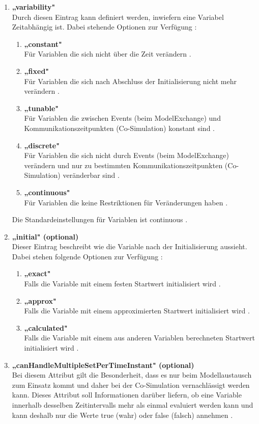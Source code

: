 \begin{enumerate}
	\item \textbf{„variability"} \cite[S.48]{25} \\
	Durch diesen Eintrag kann definiert werden, inwiefern eine Variabel Zeitabhängig ist. Dabei
	stehende Optionen zur Verfügung \cite[S.48]{25}:
	\begin{enumerate}
		\item \textbf{„constant"} \cite[S.48]{25} \\
		Für Variablen die sich nicht über die Zeit verändern \cite[S.48]{25}.
		\item \textbf{„fixed"} \cite[S.48]{25} \\
		Für Variablen die sich nach Abschluss der Initialisierung nicht mehr verändern
		\cite[S.48]{25}.
		\item \textbf{„tunable"} \cite[S.48]{25} \\
		Für Variablen die zwischen Events (beim ModelExchange) und
		Kommunikationszeitpunkten (Co-Simulation) konstant sind \cite[S.48]{25}.
		\newpage
		\item \textbf{„discrete"} \cite[S.48]{25} \\
		Für Variablen die sich nicht durch Events (beim ModelExchange)
		verändern und nur zu bestimmten Kommunikationszeitpunkten (Co-Simulation) veränderbar
		sind \cite[S.48]{25}.
		\item \textbf{„continuous"} \cite[S.48]{25} \\
		Für Variablen die keine Restriktionen für Veränderungen haben \cite[S.48]{25}.
	\end{enumerate}
	Die Standardeinstellungen für Variablen ist continuous \cite[S.48]{25}.
	\item \textbf{„initial" (optional)} \cite[S.48f]{25} \\
	Dieser Eintrag beschreibt wie die Variable nach der Initialisierung aussieht. Dabei stehen
	folgende Optionen zur Verfügung \cite[S.48f]{25}:
	\begin{enumerate}
		\item \textbf{„exact"} \cite[S.48f]{25} \\
		Falls die Variable mit einem festen Startwert initialisiert wird \cite[S.48f]{25}.
		\item \textbf{„approx"} \cite[S.48f]{25} \\
		Falls die Variable mit einem approximierten Startwert initialisiert wird
		\cite[S.48f]{25}.
		\item \textbf{„calculated"} \cite[S.48f]{25} \\
		Falls die Variable mit einem aus anderen Variablen berechneten
		Startwert initialisiert wird \cite[S.48f]{25}.
	\end{enumerate}
	\item \textbf{„canHandleMultipleSetPerTimeInstant" (optional)} \cite[S.49]{25} \\
	Bei diesem Attribut gilt die Besonderheit, dass es nur beim Modellaustausch zum Einsatz
	kommt und daher bei der Co-Simulation vernachlässigt werden kann. Dieses Attribut soll 
	Informationen darüber liefern, ob eine Variable innerhalb desselben Zeitintervalls mehr als 
	einmal evaluiert werden kann und kann deshalb nur die Werte true (wahr) oder false (falsch) 
	annehmen \cite[S.49]{25}.
\end{enumerate}
